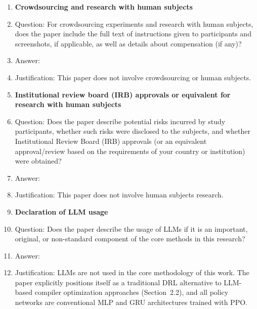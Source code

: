\begin{enumerate}
\item {\bf Crowdsourcing and research with human subjects}
    \item[] Question: For crowdsourcing experiments and research with human subjects, does the paper include the full text of instructions given to participants and screenshots, if applicable, as well as details about compensation (if any)?
    \item[] Answer: \answerNA{}
    \item[] Justification: This paper does not involve crowdsourcing or human subjects.

\item {\bf Institutional review board (IRB) approvals or equivalent for research with human subjects}
    \item[] Question: Does the paper describe potential risks incurred by study participants, whether such risks were disclosed to the subjects, and whether Institutional Review Board (IRB) approvals (or an equivalent approval/review based on the requirements of your country or institution) were obtained?
    \item[] Answer: \answerNA{}
    \item[] Justification: This paper does not involve human subjects research.

\item {\bf Declaration of LLM usage}
    \item[] Question: Does the paper describe the usage of LLMs if it is an important, original, or non-standard component of the core methods in this research?
    \item[] Answer: \answerNA{}
    \item[] Justification: LLMs are not used in the core methodology of this work. The paper explicitly positions itself as a traditional DRL alternative to LLM-based compiler optimization approaches (Section~2.2), and all policy networks are conventional MLP and GRU architectures trained with PPO.

\end{enumerate}